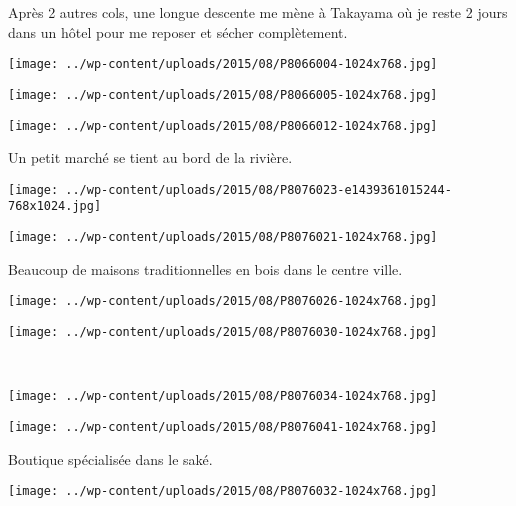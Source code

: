  Après 2 autres cols, une longue descente me mène à Takayama où je reste 2 jours dans un hôtel pour me reposer et sécher complètement. 
\begin{center} \texttt{[image: ../wp-content/uploads/2015/08/P8066004-1024x768.jpg]} \end{center}
\begin{center} \texttt{[image: ../wp-content/uploads/2015/08/P8066005-1024x768.jpg]} \end{center}
\vfill
\begin{center} \texttt{[image: ../wp-content/uploads/2015/08/P8066012-1024x768.jpg]} \end{center}
\vspace{-\topsep}
\vspace{-0.75mm}
\pagebreak

 Un petit marché se tient au bord de la rivière. 
\begin{center} \texttt{[image: ../wp-content/uploads/2015/08/P8076023-e1439361015244-768x1024.jpg]} \end{center}
\begin{center} \texttt{[image: ../wp-content/uploads/2015/08/P8076021-1024x768.jpg]} \end{center}

 Beaucoup de maisons traditionnelles en bois dans le centre ville. 
\begin{center} \texttt{[image: ../wp-content/uploads/2015/08/P8076026-1024x768.jpg]} \end{center}
\begin{center} \texttt{[image: ../wp-content/uploads/2015/08/P8076030-1024x768.jpg]} \end{center}
\vspace{-\topsep}
\vspace{-3.25mm}
\pagebreak
~
\begin{center} \texttt{[image: ../wp-content/uploads/2015/08/P8076034-1024x768.jpg]} \end{center}
\begin{center} \texttt{[image: ../wp-content/uploads/2015/08/P8076041-1024x768.jpg]} \end{center}
\vspace{-\topsep}
\vspace{-3.25mm}
\pagebreak

 Boutique spécialisée dans le saké. 
\begin{center} \texttt{[image: ../wp-content/uploads/2015/08/P8076032-1024x768.jpg]} \end{center}

